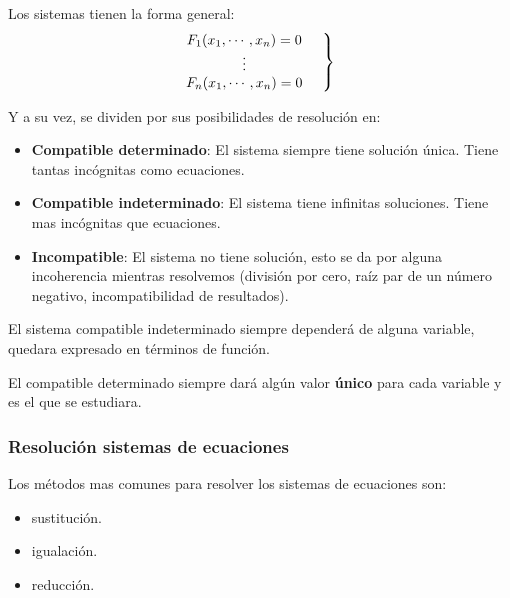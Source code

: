     Los sistemas tienen la forma general:
    \begin{equation*}
        \left.
        \begin{matrix}
            F_1(x_1,\cdots,x_n)=0\\
            \vdots\\
            F_n(x_1,\cdots,x_n)=0
        \end{matrix}
        \hspace*{0.5cm}\right\rbrace
    \end{equation*}

    Y a su vez, se dividen por sus posibilidades de resolución en:

    \begin{itemize}
        \item \textbf{Compatible determinado}: El sistema siempre tiene solución única.
            Tiene tantas incógnitas como ecuaciones.

        \item \textbf{Compatible indeterminado}: El sistema tiene infinitas soluciones.
            Tiene mas incógnitas que ecuaciones.

        \item \textbf{Incompatible}: El sistema no tiene solución, esto se da por alguna
            incoherencia mientras resolvemos (división por cero, raíz par de un número
            negativo, incompatibilidad de resultados).
    \end{itemize}

    El sistema compatible indeterminado siempre dependerá de alguna variable,
    quedara expresado en términos de función.

    El compatible determinado siempre dará algún valor \textbf{único} para cada
    variable y es el que se estudiara.

    \subsubsection{Resolución sistemas de ecuaciones}

    Los métodos mas comunes para resolver los sistemas de ecuaciones son:

    \begin{itemize}
        \item sustitución.
        \item igualación.
        \item reducción.
    \end{itemize}

